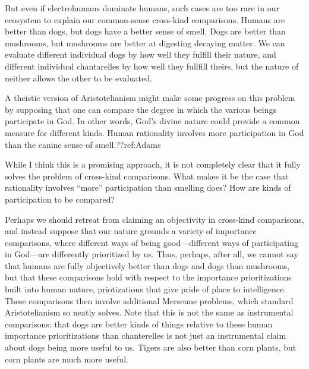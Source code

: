 But even if electrohumans dominate humans, such cases are too rare in our ecosystem to explain our common-sense 
cross-kind comparisons. Humans are better than dogs, but dogs have a better sense of smell. Dogs are better than mushrooms,
but mushrooms are better at digesting decaying matter. We can evaluate different individual dogs by how well they 
fulfill their nature, and different individual chantarelles by how well they fullfill theirs, but the nature of neither
allows the other to be evaluated.

A theistic version of Aristotelianism might make some progress on this problem by supposing that one can
compare the degree in which the various beings participate in God. In other words, God's divine nature could 
provide a common measure for different kinds. Human rationality involves more participation in God than the canine 
sense of smell.??ref:Adams

While I think this is a promising approach, it is not completely clear that it fully solves the problem of cross-kind 
comparisons. What makes it be the case that rationality involves ``more'' participation than smelling does? How are 
kinds of participation to be compared? 

Perhaps we should retreat from claiming an objectivity in cross-kind comparisons, and instead suppose that our nature 
grounds a variety of importance comparisons, where different ways of being good---different ways of participating in 
God---are differently prioritized by us. Thus, perhaps, after all, we cannot say that humans are fully objectively 
better than dogs and dogs than mushrooms, but that these comparisons hold with respect to the importance prioritizations
built into human nature, priotizations that give pride of place to intelligence. These comparisons then involve 
additional Mersenne problems, which standard Aristotelianism so neatly solves. Note that this is not the same as 
instrumental comparisons: that dogs are better kinds of things relative to these human importance prioritizations than
chanterelles is not just an instrumental claim about dogs being more useful to us. Tigers are also better than corn plants,
but corn plants are much more useful.

